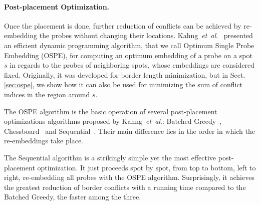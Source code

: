 \documentclass{llncs}
\newcommand{\ignore}[1]{}
\begin{document}
\paragraph{Post-placement Optimization.}
Once the placement is done, further reduction of conflicts can be
achieved by re-embedding the probes without changing their locations.
Kahng~{\it et~al}.~\cite{KAHNG02} presented an efficient dynamic programming
algorithm, that we call Optimum Single Probe Embedding (OSPE), for computing an
optimum embedding of a probe on a spot $s$ in regards to the probes of
neighboring spots, whose embeddings are considered fixed.
Originally, it was developed for border length minimization, but
in Sect.\,\ref{sec:ospe}, we show how it can also be used for minimizing the
sum of conflict indices in the region around $s$.

The OSPE algorithm is the basic operation of several post-placement optimizations
algorithms proposed by Kahng~{\it et~al}.: Batched Greedy~\cite{KAHNG02},
Chessboard~\cite{KAHNG02} and Sequential~\cite{KAHNG03B}. Their main difference lies in
the order in which the re-embeddings take place.

\ignore{
The first algorithm is a simple greedy approach that computes, for each spot of the chip,
the maximum reduction of conflicts that could be achieved by re-embedding its probe with
the OSPE algorithm. It then greedily selects the spot with higher gain and re-embeds
its probe optimally in regards to its neighbors, updating the gains of affected
spots. A faster version, called Batched Greedy, sacrifices its greedy nature by postponing
the update of gains and re-embedding all probes that have not been affected by the
re-embeddings performed in the current iteration.

The Chessboard optimization is based on the fact that a chip can be bi-colored
just like a chessboard, in such a way that the embeddings of probes located on
white spots, with respect to border length, are independent of those placed on black spots,
and vice-versa. The Chessboard uses this coloring to alternate the optimal re-embedding
of probes located on black and white spots.
}

The Sequential algorithm is a strikingly simple yet the most effective post-placement
optimization. It just proceeds spot by spot, from top to bottom, left to right,
re-embedding all probes with the OSPE algorithm. Surprisingly, it achieves the greatest
reduction of border conflicts with a running time compared to the Batched Greedy,
the faster among the three.
\end{document}
